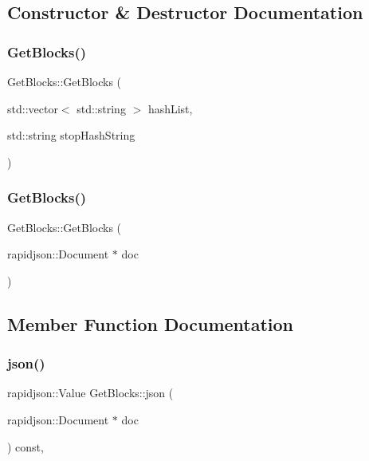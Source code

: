 \subsection{Constructor \& Destructor Documentation}
\mbox{\label{classGetBlocks_aec0906bd19989a7982cad0aefc3d750a}} 
\subsubsection{\texorpdfstring{Get\+Blocks()}{GetBlocks()}\hspace{0.1cm}{\footnotesize\ttfamily [1/2]}}
{\footnotesize\ttfamily Get\+Blocks\+::\+Get\+Blocks (\begin{DoxyParamCaption}\item[{std\+::vector$<$ std\+::string $>$}]{hash\+List,  }\item[{std\+::string}]{stop\+Hash\+String }\end{DoxyParamCaption})}

\mbox{\label{classGetBlocks_a0ce69110b775f4f122f6a20222cc0b64}} 
\subsubsection{\texorpdfstring{Get\+Blocks()}{GetBlocks()}\hspace{0.1cm}{\footnotesize\ttfamily [2/2]}}
{\footnotesize\ttfamily Get\+Blocks\+::\+Get\+Blocks (\begin{DoxyParamCaption}\item[{rapidjson\+::\+Document $\ast$}]{doc }\end{DoxyParamCaption})\hspace{0.3cm}{\ttfamily [explicit]}}



\subsection{Member Function Documentation}
\mbox{\label{classGetBlocks_a8b77916e999ba0a730e31b90b4733928}} 
\subsubsection{\texorpdfstring{json()}{json()}}
{\footnotesize\ttfamily rapidjson\+::\+Value Get\+Blocks\+::json (\begin{DoxyParamCaption}\item[{rapidjson\+::\+Document $\ast$}]{doc }\end{DoxyParamCaption}) const\hspace{0.3cm}{\ttfamily [override]}, {\ttfamily [virtual]}}



